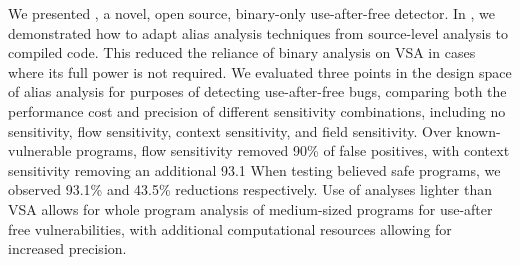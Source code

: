 We presented \aliasname, a novel, open source, binary-only use-after-free detector.
In \aliasname, we demonstrated how to adapt alias analysis techniques from source-level analysis to compiled code.
This reduced the reliance of binary analysis on VSA in cases where its full power is not required.
We evaluated three points in the design space of alias analysis for purposes of detecting use-after-free bugs, comparing both the performance cost and precision of different sensitivity combinations, including no sensitivity, flow sensitivity, context sensitivity, and field sensitivity.
Over known-vulnerable programs, flow sensitivity removed 90\% of false positives, with context sensitivity removing an additional 93.1%
When testing believed safe programs, we observed 93.1\% and 43.5\% reductions respectively.
Use of analyses lighter than VSA allows for whole program analysis of medium-sized programs for use-after free vulnerabilities, with additional computational resources allowing for increased precision.
